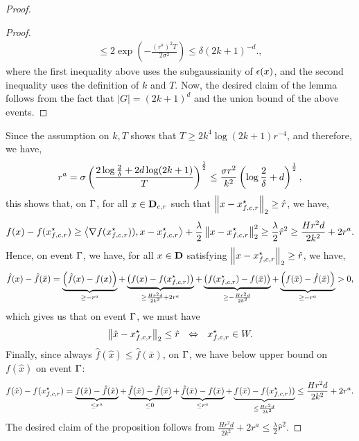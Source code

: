 \begin{proof}
\begin{proof}
\begin{align*}
		\leq 2\exp\left(-\frac{(r^a)^2T}{2\sigma^2}\right) 
			\leq \delta (2k+1)^{-d}., 
\end{align*}
where the first inequality above uses the subgaussianity of $\epsilon(x)$, and 
the second inequality uses the definition of $k$ and $T$. 
Now, the desired claim of the lemma follows from the fact that 
$|G| = (2k+1)^d$ and the union bound of the above events. 
\end{proof}
Since the assumption on $k, T$ shows that $T \geq 2k^4\log(2k+1)r^{-4}$, 
and therefore, we have, 
\begin{equation*}
r^a = \sigma \left(\frac{2\log \frac{2}{\delta} + 2d \log(2k+1)}{T}\right)^{\frac{1}{2}}
	\leq \frac{\sigma r^2}{k^2} \left(\log \frac{2}{\delta}+ d\right)^{\frac{1}{2}}, 
\end{equation*}
this shows that, on $\Gamma$, for all $x\in\mathbf{D}_{c, r}$ such that 
$\left\|{x-x_{f, c, r}^\star}\right\|_2 \geq \hat{r}$, we have, 
\begin{equation*}
f(x) - f(x_{f, c, r}^\star) \geq \left<\nabla f(x_{f, c, r}^\star)), x- x_{f, c, r}^\star\right>
	+ \frac{\lambda}{2} \left\|{x-x_{f, c, r}^\star}\right\|_2^2 \geq 
	\frac{\lambda}{2} \hat{r}^2 \geq \frac{Hr^2d}{2 k^2} + 2 r^a.
\end{equation*}
Hence, on event $\Gamma$, we have, for all $x\in \mathbf{D}$ satisfying 
$\left\|{x-x_{f, c, r}^\star}\right\|_2 \geq \hat{r}$, we have, 
\begin{equation*}
\hat{f}(x) - \hat{f}(\bar{x}) = \underbrace{\left(\hat{f}(x) - f(x)\right)}_{\geq -r^a} 
	+ \underbrace{\left(f(x) - f(x_{f, c, r}^\star)\right)}_{\geq \frac{Hr^2d}{2k^2} + 2r^a}
	+ \underbrace{\left(f(x_{f, c, r}^\star) - f(\bar{x}) \right)}_{\geq -\frac{Hr^2d}{2k^2}}
	+ \underbrace{\left(f(\bar{x}) - \hat{f}(\bar{x})\right)}_{\geq -r^a} > 0, 
\end{equation*}
which gives us that on event $\Gamma$, we must have 
\begin{equation*}
\left\|{\hat{x} - x_{f, c, r}^\star}\right\|_2 \leq \hat{r}
	~~\Leftrightarrow~~ x_{f, c, r}^\star \in W.
\end{equation*}
Finally, since always $\hat{f}(\hat{x}) \leq \hat{f}(\bar{x})$, on $\Gamma$, we have 
below upper bound on $f(\hat{x})$ on event $\Gamma$:
\begin{equation*}
f(\hat{x}) - f(x_{f, c, r}^\star) = 
	\underbrace{f(\hat{x}) - \hat{f}(\hat{x})}_{\leq r^a}
	+ \underbrace{\hat{f}(\hat{x}) - \hat{f}(\bar{x})}_{\leq 0}
	+ \underbrace{\hat{f}(\bar{x}) - f(\bar{x})}_{\leq r^a}
 	+ \underbrace{f(\bar{x}) -  f(x_{f, c, r}^\star))}_{\leq \frac{Hr^2d}{2k^2}} 
	\leq \frac{Hr^2d}{2k^2} + 2r^a.
\end{equation*}
The desired claim of the proposition follows from $ \frac{Hr^2d}{2k^2} + 2r^a
	\leq \frac{\lambda}{2} \hat{r}^2$.
\end{proof}

